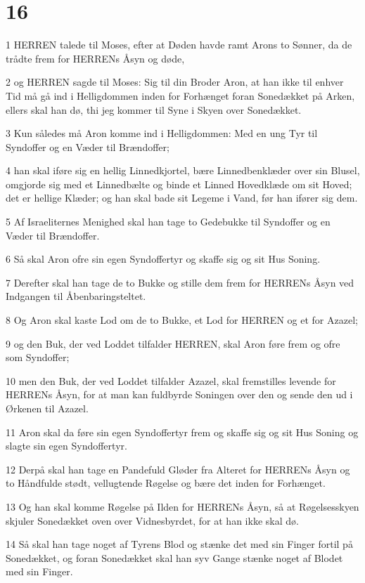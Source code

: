 \chapter{16}

\par 1 HERREN talede til Moses, efter at Døden havde ramt Arons to Sønner, da de trådte frem for HERRENs Åsyn og døde,
\par 2 og HERREN sagde til Moses: Sig til din Broder Aron, at han ikke til enhver Tid må gå ind i Helligdommen inden for Forhænget foran Sonedækket på Arken, ellers skal han dø, thi jeg kommer til Syne i Skyen over Sonedækket.
\par 3 Kun således må Aron komme ind i Helligdommen: Med en ung Tyr til Syndoffer og en Væder til Brændoffer;
\par 4 han skal iføre sig en hellig Linnedkjortel, bære Linnedbenklæder over sin Blusel, omgjorde sig med et Linnedbælte og binde et Linned Hovedklæde om sit Hoved; det er hellige Klæder; og han skal bade sit Legeme i Vand, før han ifører sig dem.
\par 5 Af Israeliternes Menighed skal han tage to Gedebukke til Syndoffer og en Væder til Brændoffer.
\par 6 Så skal Aron ofre sin egen Syndoffertyr og skaffe sig og sit Hus Soning.
\par 7 Derefter skal han tage de to Bukke og stille dem frem for HERRENs Åsyn ved Indgangen til Åbenbaringsteltet.
\par 8 Og Aron skal kaste Lod om de to Bukke, et Lod for HERREN og et for Azazel;
\par 9 og den Buk, der ved Loddet tilfalder HERREN, skal Aron føre frem og ofre som Syndoffer;
\par 10 men den Buk, der ved Loddet tilfalder Azazel, skal fremstilles levende for HERRENs Åsyn, for at man kan fuldbyrde Soningen over den og sende den ud i Ørkenen til Azazel.
\par 11 Aron skal da føre sin egen Syndoffertyr frem og skaffe sig og sit Hus Soning og slagte sin egen Syndoffertyr.
\par 12 Derpå skal han tage en Pandefuld Gløder fra Alteret for HERRENs Åsyn og to Håndfulde stødt, vellugtende Røgelse og bære det inden for Forhænget.
\par 13 Og han skal komme Røgelse på Ilden for HERRENs Åsyn, så at Røgelsesskyen skjuler Sonedækket oven over Vidnesbyrdet, for at han ikke skal dø.
\par 14 Så skal han tage noget af Tyrens Blod og stænke det med sin Finger fortil på Sonedækket, og foran Sonedækket skal han syv Gange stænke noget af Blodet med sin Finger.
